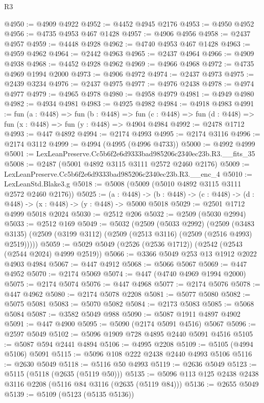 \begin{lexlean}{R3}
\begin{coremodule}
@4950 := @4909 @4922
@4952 := @4452 @4945 @2176
@4953 := @4950 @4952
@4956 := @4735 @4953 @467 @1428
@4957 := @4906 @4956
@4958 := @2437 @4957
@4959 := @4448 @4928
@4962 := @4740 @4953 @467 @1428
@4963 := @4959 @4962
@4964 := @2442 @4963
@4965 := @2437 @4964
@4966 := @4909 @4938
@4968 := @4452 @4928 @4962
@4969 := @4966 @4968
@4972 := @4735 @4969 @1994 @2000
@4973 := @4906 @4972
@4974 := @2437 @4973
@4975 := @2439 @3234
@4976 := @2437 @4975
@4977 := @4976 @2438
@4978 := @4974 @4977
@4979 := @4965 @4978
@4980 := @4958 @4979
@4981 := @4949 @4980
@4982 := @4934 @4981
@4983 := @4925 @4982
@4984 := @4918 @4983
@4991 := fun (a : @448) =>
  fun (b : @448) =>
  fun (c : @448) => fun (d : @448) => fun (x : @448) => fun (y : @448) => @4904 @4984
@4992 := @2478 @1712
@4993 := @447 @4892
@4994 := @2174 @4993
@4995 := @2174 @3116
@4996 := @2174 @3112
@4999 := @4994 (@4995 (@4996 @4733))
@5000 := @4992 @4999
@5001 := LexLeanPreserve.Cc5b6f2e6d9333bad985206c2340ec23b.R3.__fits_35
@5008 := @2487 (@5001 @4892 @3115 @3111 @2572 @2460 @2176)
@5009 := LexLeanPreserve.Cc5b6f2e6d9333bad985206c2340ec23b.R3.__enc_4
@5010 := LexLeanStd.Blake3.g
@5018 := @5008 (@5009 (@5010 @4892 @3115 @3111 @2572 @2460 @2176))
@5025 := (a : @448) ->
  (b : @448) -> (c : @448) -> (d : @448) -> (x : @448) -> (y : @448) -> @5000 @5018
@5029 := @2501 @1712 @4999 @5018 @2024
@5030 := @2512 @206
@5032 := @2509 (@5030 @2994)
@5033 := @2512 @169
@5049 := @5032
    (@2509
      (@5033 @2992)
      (@2509 (@3483 @3135) (@2509 (@3199 @3112) (@2509 (@2513 @3116) (@2509 (@2516 @4993) @2519)))))
@5059 := @5029 @5049 (@2526 (@2536 @1712)) (@2542 (@2543 (@2544 @2024) @4999 @2519))
@5066 := @3366 @5049 @253 @13 @1912 @2022 @4903 @4984
@5067 := @447 @4912
@5068 := @5066 @5067
@5069 := @447 @4952
@5070 := @2174 @5069
@5074 := @447 (@4740 @4969 @1994 @2000)
@5075 := @2174 @5074
@5076 := @447 @4968
@5077 := @2174 @5076
@5078 := @447 @4962
@5080 := @2174 @5078 @2208
@5081 := @5077 @5080
@5082 := @5075 @5081
@5083 := @5070 @5082
@5084 := @2173 @5083
@5085 := @5068 @5084
@5087 := @3582 @5049 @988
@5090 := @5087 @1911 @4897 @4902
@5091 := @447 @4900
@5095 := @5090 (@2174 @5091 @4516) @5067
@5096 := @2597 @5049
@5102 := @5096 @1909 @728 @4895 @2440 @5091 @4516
@5105 := @5087 @594 @2441 @4894
@5106 := @4995 @2208
@5109 := @5105 (@4994 @5106) @5091
@5115 := @5096 @108 @222 @2438 @2440 @4993 @5106
@5116 := @2630 @5049
@5118 := @5116 @50 @4993
@5119 := @2636 @5049
@5123 := @5115 (@5118 (@2635 (@5119 @50)))
@5135 := @5096 @113 @125 @2438 @2438 @3116 @2208 (@5116 @84 @3116 (@2635 (@5119 @84)))
@5136 := @2655 @5049
@5139 := @5109 (@5123 (@5135 @5136))

\end{coremodule}
\end{lexlean}
